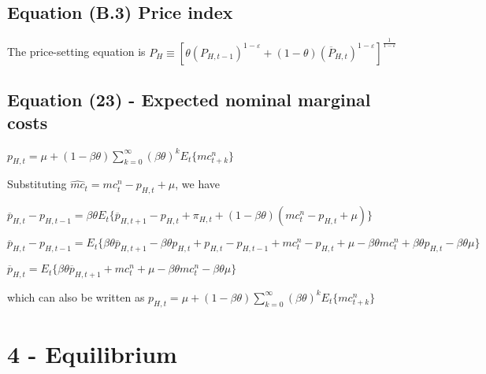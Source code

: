 \documentclass[
]{article}
\begin{document}
\vspace{12pt}

\hypertarget{equation-b.3-price-index}{%
\subsection{Equation (B.3) Price index}\label{equation-b.3-price-index}}

\vspace{8pt}

The price-setting equation is
\(\displaystyle P_H \equiv \left[ \theta (P_{H,t-1})^{1-\varepsilon} + (1-\theta)(\overline{P}_{H,t})^{1-\varepsilon}\right]^{\frac{1}{1-\varepsilon}}\)

\vspace{12pt}

\hypertarget{equation-23---expected-nominal-marginal-costs}{%
\subsection{Equation (23) - Expected nominal marginal
costs}\label{equation-23---expected-nominal-marginal-costs}}

\(\displaystyle p_{H,t}=\mu + (1-\beta \theta)\sum_{k=0}^\infty(\beta \theta)^kE_t \{ mc_{t+k}^n\}\)

\vspace{8pt}

Substituting \(\widehat{mc}_t = mc_t^n-p_{H,t}+\mu\), we have

\(\overline{p}_{H,t}-p_{H,t-1}=\beta \theta E_t \{ \overline{p}_{H,t+1}-p_{H,t} + \pi_{H,t}+(1-\beta \theta)(mc_t^n-p_{H,t}+\mu)\}\)

\(\overline{p}_{H,t}-p_{H,t-1} = E_t \{ \beta \theta\overline{p}_{H,t+1}-\beta \theta p_{H,t} + p_{H,t}- p_{H,t-1} +mc_t^n-p_{H,t}+\mu - \beta \theta mc_t^n + \beta \theta p_{H,t} - \beta \theta \mu \}\)

\(\overline{p}_{H,t} = E_t \{ \beta \theta\overline{p}_{H,t+1} +mc_t^n +\mu - \beta \theta mc_t^n - \beta \theta \mu \}\)

which can also be written as
\(\displaystyle p_{H,t}=\mu + (1-\beta \theta)\sum_{k=0}^\infty(\beta \theta)^kE_t \{ mc_{t+k}^n\}\)

\vspace{12pt}

\hypertarget{equilibrium}{%
\section{4 - Equilibrium}\label{equilibrium}}
\end{document}
